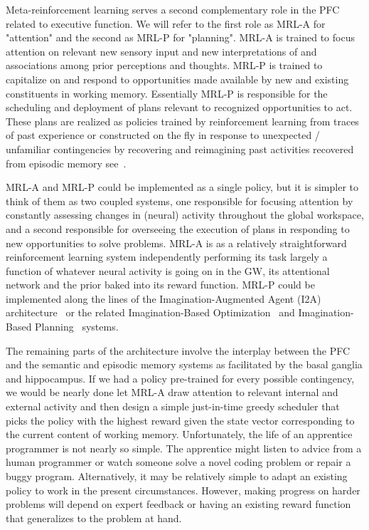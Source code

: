 
Meta-reinforcement learning serves a second complementary role in the PFC related to executive function. We will refer to the first role as MRL-A for "attention" and the second as MRL-P for "planning". MRL-A is trained to focus attention on relevant new sensory input and new interpretations of and associations among prior perceptions and thoughts. MRL-P is trained to capitalize on and respond to opportunities made available by new and existing constituents in working memory. Essentially MRL-P is responsible for the scheduling and deployment of plans relevant to recognized opportunities to act. These plans are realized as policies trained by reinforcement learning from traces of past experience or constructed on the fly in response to unexpected / unfamiliar contingencies by recovering and reimagining past activities recovered from episodic memory \emdash{} see~{{}}.

MRL-A and MRL-P could be implemented as a single policy, but it is simpler to think of them as two coupled systems, one responsible for focusing attention by constantly assessing changes in (neural) activity throughout the global workspace, and a second responsible for overseeing the execution of plans in responding to new opportunities to solve problems. MRL-A is as a relatively straightforward reinforcement learning system independently performing its task largely a function of whatever neural activity is going on in the GW, its attentional network and the prior baked into its reward function. MRL-P could be implemented along the lines of the Imagination-Augmented Agent (I2A) architecture~\cite{WeberetalCoRR-17} or the related Imagination-Based Optimization~\cite{HamricketalCoRR-17} and Imagination-Based Planning~\cite{PascanuetalCoRR-17} systems.


The remaining parts of the architecture involve the interplay between the PFC and the semantic and episodic memory systems as facilitated by the basal ganglia and hippocampus. If we had a policy pre-trained for every possible contingency, we would be nearly done \emdash{} let MRL-A draw attention to relevant internal and external activity and then design a simple just-in-time greedy scheduler that picks the policy with the highest reward given the state vector corresponding to the current content of working memory. Unfortunately, the life of an apprentice programmer is not nearly so simple. The apprentice might listen to advice from a human programmer or watch someone solve a novel coding problem or repair a buggy program. Alternatively, it may be relatively simple to adapt an existing policy to work in the present circumstances. However, making progress on harder problems will depend on expert feedback or having an existing reward function that generalizes to the problem at hand. 

